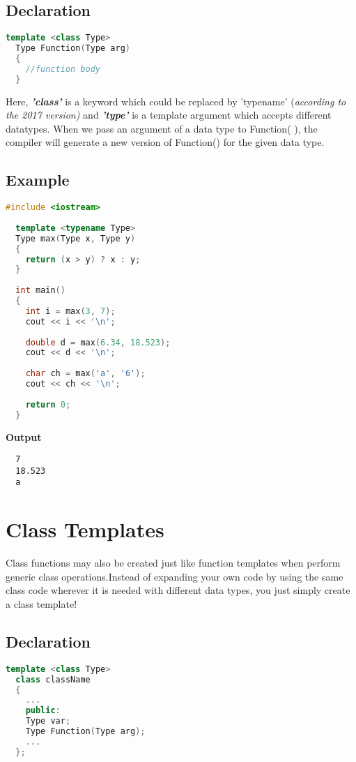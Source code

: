 \documentclass[11pt,fleqn]{book} %
\begin{document}
\subsection{Declaration}
\begin{lstlisting}[language=C++, caption= Declaration Of Function Templates]
  template <class Type>
  Type Function(Type arg)
  {
    //function body
  }
\end{lstlisting}

Here, \textbf{\textit{'class'}} is a keyword which could be replaced by 'typename' {(\it{according to the 2017 version})} and \textbf{\textit{'type'}} is a template argument which accepts different datatypes. When we pass an argument of a data type to Function( ), the compiler will generate a new version of Function() for the given data type.\\

\subsection{Example}

\begin{lstlisting}[language=C++, caption= Eg:Function Template to output the greater number
  ]
  #include <iostream>
  
  template <typename Type>
  Type max(Type x, Type y)
  {
    return (x > y) ? x : y;
  }
  
  int main()
  {
    int i = max(3, 7);
    cout << i << '\n';
    
    double d = max(6.34, 18.523);
    cout << d << '\n';
    
    char ch = max('a', '6');
    cout << ch << '\n';
    
    return 0;
  }
\end{lstlisting}
\textbf{Output}
\begin{lstlisting}
  7
  18.523
  a
\end{lstlisting}

\section{Class Templates}
Class functions may also be created just like function templates when perform generic class operations.Instead of expanding your own code by using the same class code wherever it is needed with different data types, you just simply create a class template!

\subsection{Declaration}
\begin{lstlisting}[language=C++, caption= Declaration Of Class Templates]
  template <class Type>
  class className
  {
    ...
    public:
    Type var;
    Type Function(Type arg);
    ... 
  };
\end{lstlisting}
\end{document}

